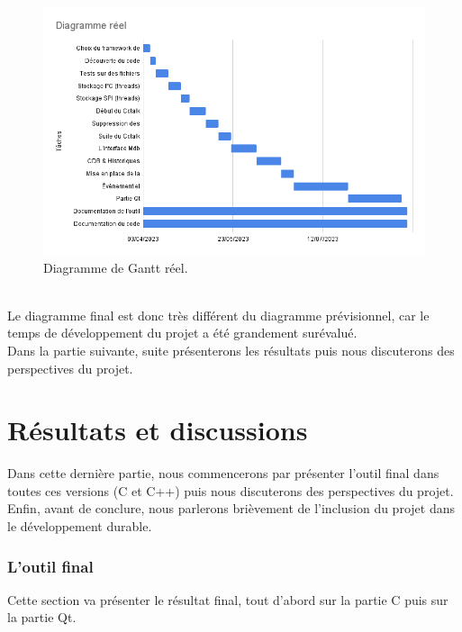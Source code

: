 \documentclass[a4paper]{article}
\begin{document}
\begin{figure}[h!]
  \begin{center}
  \includegraphics[scale=0.6]{./img/diagramme-reel.png}
  \caption{Diagramme de Gantt réel.}
    \label{fig:finalgantt}
  \end{center}
\end{figure}~\\

Le diagramme final est donc très différent du diagramme prévisionnel, car le
temps de développement du projet a été grandement surévalué.\\

Dans la partie suivante, suite présenterons les résultats puis nous discuterons
des perspectives du projet.
\clearpage
\part{Résultats et discussions}

Dans cette dernière partie, nous commencerons par présenter l'outil final dans
toutes ces versions (C et C++) puis nous discuterons des perspectives du projet.
Enfin, avant de conclure, nous parlerons brièvement de l'inclusion du projet
dans le développement durable.

\section{L'outil final}%

Cette section va présenter le résultat final, tout d'abord sur la partie C puis
sur la partie Qt.\\
\end{document}
